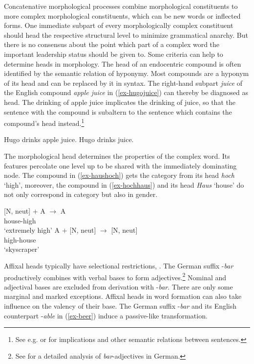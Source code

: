 \documentclass[output=paper
  ,nobabel
  ,draftmode
  ,colorlinks, citecolor=brown
]{langscibook}
\begin{document}
Concatenative morphological processes combine morphological constituents to more complex morphological constituents, which can be new words or inflected forms. One immediate subpart of every morphologically complex constituent should head the respective structural level to minimize grammatical anarchy. But there is no consensus about the point which part of a complex word the important leadership status should be given to. Some criteria can help to determine heads in morphology. The head of an endocentric compound is often identified by the semantic relation of hyponymy. Most compounds are a hyponym of its head and can be replaced by it in syntax. The right-hand subpart \emph{juice} of the English compound \emph{apple juice} in (\ref{ex-hugojuice}) can thereby be diagnosed as head. The drinking of apple juice implicates the drinking of juice, so that the sentence with the compound is subaltern to the sentence which contains the compound's head instead.\footnote{See e.g. \citet[Section~4.3]{Loebner2003} or \citet[Section~5.2]{SchwarzChur2001} for implications and other semantic relations between sentences.}

\eal
\ex\label{ex-hugojuice} Hugo drinks apple juice.
\ex Hugo drinks juice.
\zl

\noindent The morphological head determines the properties of the complex word. Its features percolate one level up to be shared with the immediately dominating node. The compound in (\ref{ex-haushoch}) gets the category from its head \emph{hoch} `high', moreover, the compound in (\ref{ex-hochhaus}) and its head \emph{Haus} `house' do not only correspond in category but also in gender.

\eal
\ex\label{ex-haushoch}
 \hspace{20pt} [N, neut] $+$ A $\rightarrow$ A \\
house-high\\
`extremely high'
\ex\label{ex-hochhaus}
 \hspace{20pt} A $+$ [N, neut] $\rightarrow$ [N, neut]\\
high-house \\
`skyscraper'
\zl

\noindent Affixal heads typically have selectional restrictions, \citep[cf.][77]{Hoehle1982}. The German suffix -\emph{bar} productively combines with verbal bases to form adjectives.\footnote{See \citet{Riehemann1998} for a detailed analysis of \emph{bar}-adjectives in German.} Nominal and adjectival bases are excluded from derivation with -\emph{bar}. There are only some marginal and marked exceptions. Affixal heads in word formation can also take influence on the valency of their base. The German suffix -\emph{bar} and its English counterpart -\emph{able} in (\ref{ex-beer}) induce a passive-like transformation.
\end{document}
